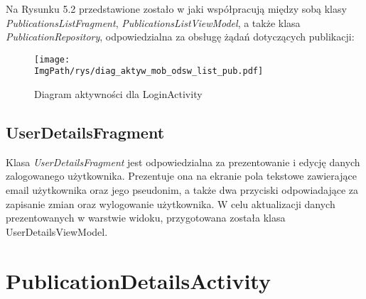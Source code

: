 \documentclass[a4paper,12pt,twoside,openany]{report}
\newcommand{\ImgPath}{.}
\begin{document}
Na Rysunku 5.2 przedstawione zostało w jaki współpracują między sobą klasy \textit{PublicationsListFragment}, \textit{PublicationsListViewModel}, a także klasa \textit{PublicationRepository}, odpowiedzialna za obsługę żądań dotyczących publikacji:
\begin{figure}[!htbp]
	\begin{center}
		\centering
		\texttt{[image: \\ImgPath/rys/diag\_aktyw\_mob\_odsw\_list\_pub.pdf]}
	\end{center}
	\caption{Diagram aktywności dla LoginActivity}
	\label{diagramAktywnosciLoginActivity}
\end{figure}

\subsection{UserDetailsFragment}
Klasa \textit{UserDetailsFragment} jest odpowiedzialna za prezentowanie i edycję danych zalogowanego użytkownika. Prezentuje ona na ekranie pola tekstowe zawierające email użytkownika oraz jego pseudonim, a także dwa przyciski odpowiadające za zapisanie zmian oraz wylogowanie użytkownika. W celu aktualizacji danych prezentowanych w warstwie widoku, przygotowana została klasa UserDetailsViewModel.

\section{PublicationDetailsActivity}

\begin{thebibliography}{99}



\end{thebibliography}

\zakonczenie  %
\end{document}
